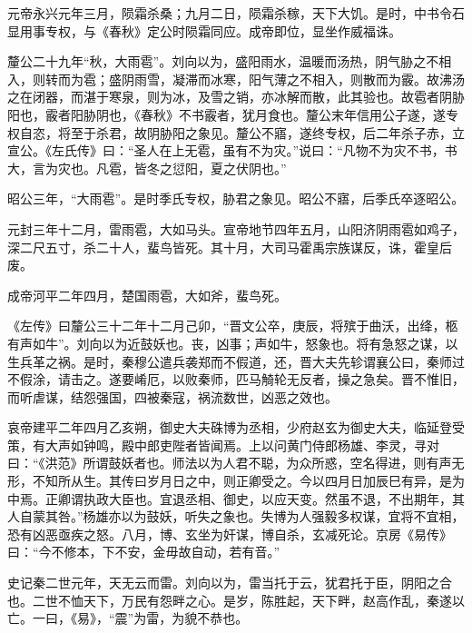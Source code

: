 \documentclass[12pt,UTF8]{ctexbook}
\begin{document}
元帝永兴元年三月，陨霜杀桑；九月二日，陨霜杀稼，天下大饥。是时，中书令石显用事专权，与《春秋》定公时陨霜同应。成帝即位，显坐作威福诛。



釐公二十九年“秋，大雨雹”。刘向以为，盛阳雨水，温暖而汤热，阴气胁之不相入，则转而为雹；盛阴雨雪，凝滞而冰寒，阳气薄之不相入，则散而为霰。故沸汤之在闭器，而湛于寒泉，则为冰，及雪之销，亦冰解而散，此其验也。故雹者阴胁阳也，霰者阳胁阴也，《春秋》不书霰者，犹月食也。釐公末年信用公子遂，遂专权自恣，将至于杀君，故阴胁阳之象见。釐公不寤，遂终专权，后二年杀子赤，立宣公。《左氏传》曰：“圣人在上无雹，虽有不为灾。”说曰：“凡物不为灾不书，书大，言为灾也。凡雹，皆冬之愆阳，夏之伏阴也。”



昭公三年，“大雨雹”。是时季氏专权，胁君之象见。昭公不寤，后季氏卒逐昭公。



元封三年十二月，雷雨雹，大如马头。宣帝地节四年五月，山阳济阴雨雹如鸡子，深二尺五寸，杀二十人，蜚鸟皆死。其十月，大司马霍禹宗族谋反，诛，霍皇后废。



成帝河平二年四月，楚国雨雹，大如斧，蜚鸟死。



《左传》曰釐公三十二年十二月己卯，“晋文公卒，庚辰，将殡于曲沃，出绛，柩有声如牛”。刘向以为近鼓妖也。丧，凶事；声如牛，怒象也。将有急怒之谋，以生兵革之祸。是时，秦穆公遣兵袭郑而不假道，还，晋大夫先轸谓襄公曰，秦师过不假涂，请击之。遂要崤厄，以败秦师，匹马觭轮无反者，操之急矣。晋不惟旧，而听虐谋，结怨强国，四被秦寇，祸流数世，凶恶之效也。



哀帝建平二年四月乙亥朔，御史大夫硃博为丞相，少府赵玄为御史大夫，临延登受策，有大声如钟鸣，殿中郎吏陛者皆闻焉。上以问黄门侍郎杨雄、李灵，寻对曰：“《洪范》所谓鼓妖者也。师法以为人君不聪，为众所惑，空名得进，则有声无形，不知所从生。其传曰岁月日之中，则正卿受之。今以四月日加辰巳有异，是为中焉。正卿谓执政大臣也。宜退丞相、御史，以应天变。然虽不退，不出期年，其人自蒙其咎。”杨雄亦以为鼓妖，听失之象也。失博为人强毅多权谋，宜将不宜相，恐有凶恶亟疾之怒。八月，博、玄坐为奸谋，博自杀，玄减死论。京房《易传》曰：“今不修本，下不安，金毋故自动，若有音。”



史记秦二世元年，天无云而雷。刘向以为，雷当托于云，犹君托于臣，阴阳之合也。二世不恤天下，万民有怨畔之心。是岁，陈胜起，天下畔，赵高作乱，秦遂以亡。一曰，《易》，“震”为雷，为貌不恭也。
\end{document}
